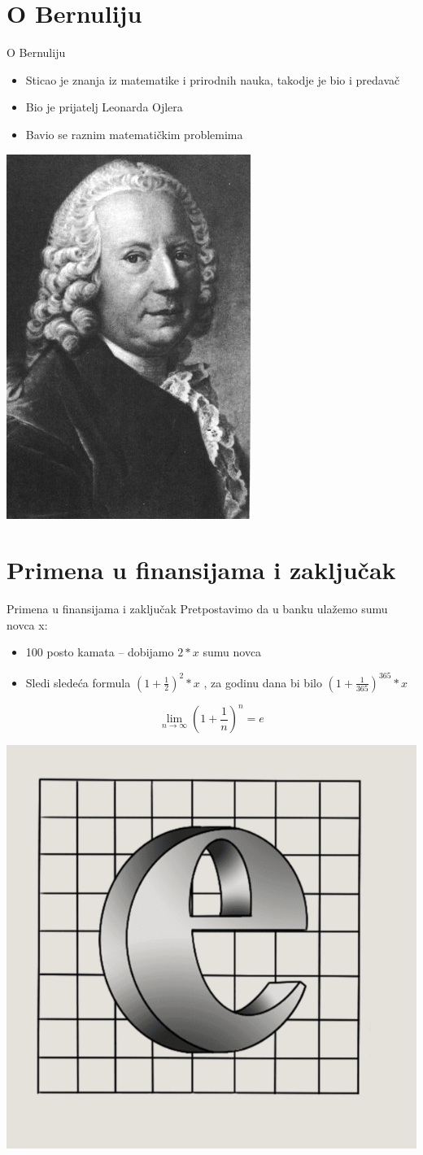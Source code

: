 \documentclass[xcolor=dvipsnames]{beamer}
\begin{document}
     \section{O Bernuliju}
    \begin{frame}
    \begin{block}{O Bernuliju}
    \begin{itemize}
        \item Sticao je znanja iz matematike i
          prirodnih nauka, takodje je bio i predavač\\
        \item Bio je prijatelj Leonarda Ojlera\\
        \item Bavio se raznim matematičkim problemima\\
    \end{itemize}
   \end{block}
    \begin{center}
    \includegraphics[height=4.cm]{bernuli.jpg}
    \end{center}
  \end{frame}
        
       \section{Primena u finansijama i zaključak}
    \begin{frame}
    \begin{block}{Primena u finansijama i zaključak}
     Pretpostavimo da u banku ulažemo sumu novca x:\\
    \begin{itemize}
        \item 100 posto kamata -- dobijamo $2*x$ sumu novca \\
        \item  Sledi sledeća formula $( 1 + \frac{1}{2} )^2 * x$ , za godinu dana bi bilo  $( 1 + \frac{1}{365} )^{365} * x$ 
    \end{itemize}
       \begin{equation}\lim_{n \rightarrow \infty} (1+\frac{1}{n})^n=e \end{equation}
   \end{block}
    \begin{center}
    \includegraphics[height=3.cm]{SlikaE.png}
    \end{center}
   \end{frame}    
\end{document}
